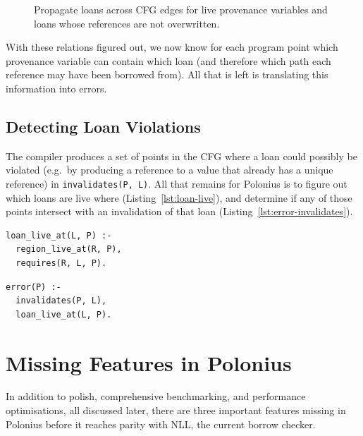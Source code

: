 \documentclass[11pt,a4paper,twoside,openany,draft]{report}
\newenvironment{sourcecode}{\captionsetup{type=listing}}{}
\newcommand{\InDatalog}[1]{\texttt{#1}}
\begin{document}
\begin{figure}
\caption[Rule for Propagating Loans Across CFG Edges]{Propagate loans across
  CFG edges for live provenance variables and loans whose references are not
  overwritten.}\label{fig:requires-edge}
\end{figure}

With these relations figured out, we now know for each program point which
provenance variable can contain which loan (and therefore which path each
reference may have been borrowed from). All that is left is translating this
information into errors.

\subsection{Detecting Loan Violations}

The compiler produces a set of points in the CFG where a loan could possibly be
violated (e.g.\ by producing a reference to a value that already has a unique
reference) in \InDatalog{invalidates(P, L)}. All that remains for Polonius is to
figure out which loans are live where (Listing~\ref{lst:loan-live}), and
determine if any of those points intersect with an invalidation of that loan
(Listing~\ref{lst:error-invalidates}).

\begin{sourcecode}
  \label{lst:loan-live}
\begin{verbatim}
loan_live_at(L, P) :-
  region_live_at(R, P),
  requires(R, L, P).
\end{verbatim}
\end{sourcecode}

\begin{sourcecode}
  \label{lst:error-invalidates}
\begin{verbatim}
error(P) :-
  invalidates(P, L),
  loan_live_at(L, P).
\end{verbatim}
\end{sourcecode}

\section{Missing Features in Polonius}\label{sec:missing-features}

In addition to polish, comprehensive benchmarking, and performance
optimisations, all discussed later, there are three important features missing
in Polonius before it reaches parity with NLL, the current borrow checker.
\end{document}
